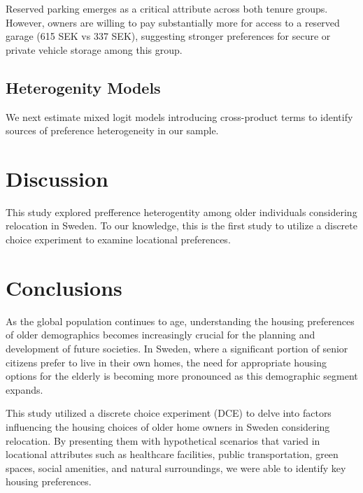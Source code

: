 \documentclass[3p,11pt ]{elsarticle}
\begin{document}
Reserved parking emerges as a critical attribute across both tenure groups. However, owners are willing to pay substantially more for access to a reserved garage (615 SEK vs 337 SEK),
suggesting stronger preferences for secure or private vehicle storage among this group.












\clearpage




\subsection{Heterogenity Models}

We next estimate mixed logit models introducing cross-product terms to identify sources of preference heterogeneity in our sample.


\section{Discussion}

This study explored prefference heterogentity among older individuals considering relocation in Sweden.
To our knowledge, 
this is the first study to utilize a discrete choice experiment to examine locational preferences.



\section{Conclusions}

As the global population continues to age, understanding the housing preferences of older demographics becomes increasingly crucial for the planning and development of future societies. In Sweden, where a significant portion of senior citizens prefer to live in their own homes, the need for appropriate housing options for the elderly is becoming more pronounced as this demographic segment expands. 

This study utilized a discrete choice experiment (DCE) to delve into factors influencing the housing choices of older home owners in Sweden considering relocation.
By presenting them with hypothetical scenarios that varied in locational attributes such as healthcare facilities, public transportation, green spaces, social amenities, and natural surroundings, we were able to identify key housing preferences.
\end{document}
